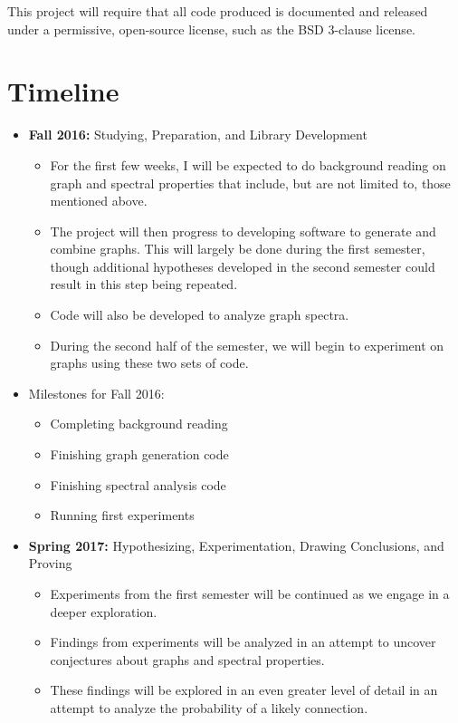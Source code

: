 \documentclass[a4paper,10pt]{article}
\begin{document}
	This project will require that all code produced is documented and released under a permissive, open-source license, such as the BSD 3-clause license.
	
	\section{Timeline}
	
	\begin{itemize}
		\item \textbf{Fall 2016:} Studying, Preparation, and Library Development 
		\begin{itemize}
			\item For the first few weeks, I will be expected to do background reading on graph and spectral properties that include, but are not limited to, those mentioned above.
			\item The project will then progress to developing software to generate and combine graphs.  This will largely be done during the first semester, though additional hypotheses developed in the second semester could result in this step being repeated.
			\item Code will also be developed to analyze graph spectra.
			\item During the second half of the semester, we will begin to experiment on graphs using these two sets of code.
		\end{itemize}
		\item Milestones for Fall 2016:
		\begin{itemize}
			\item Completing background reading
			\item Finishing graph generation code
			\item Finishing spectral analysis code
			\item Running first experiments
		\end{itemize}
		\item \textbf{Spring 2017:} Hypothesizing, Experimentation, Drawing Conclusions, and Proving
		\begin{itemize}
			\item Experiments from the first semester will be continued as we engage in a deeper exploration.
			\item Findings from experiments will be analyzed in an attempt to uncover conjectures about graphs and spectral properties.
			\item These findings will be explored in an even greater level of detail in an attempt to analyze the probability of a likely connection.

\end{itemize}
\end{itemize}
\end{document}
